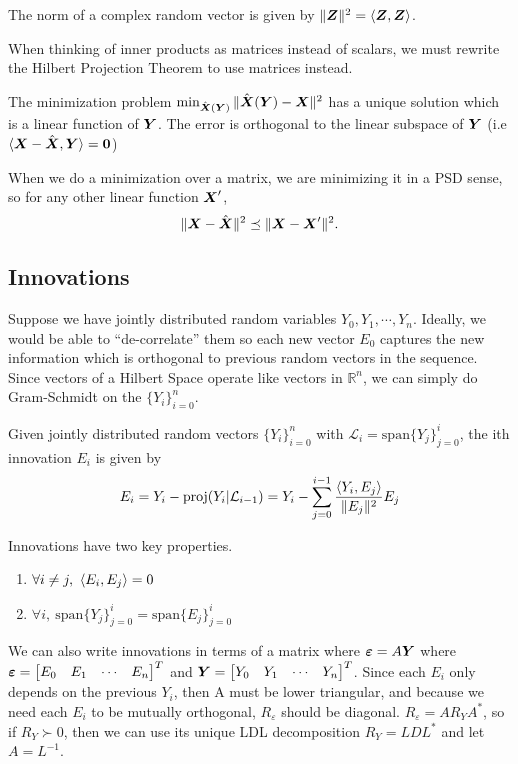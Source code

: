 \begin{definition}
	The norm of a complex random vector is given by $\|\boldsymbol{Z}\|^2 = \langle \boldsymbol{Z}, \boldsymbol{Z} \rangle$.
	\label{defn:norm}
\end{definition}
When thinking of inner products as matrices instead of scalars, we must rewrite the Hilbert Projection Theorem to use matrices instead.
\begin{theorem}
	The minimization problem $\min_{\hat{\boldsymbol{X}}(\boldsymbol{Y})}\|\hat{\boldsymbol{X}}(\boldsymbol{Y}) - \boldsymbol{X}\|^2$ has a unique solution which is a linear function of $\boldsymbol{Y}$. The error is orthogonal to the linear subspace of $\boldsymbol{Y}$ (i.e $\langle \boldsymbol{X} - \hat{\boldsymbol{X}}, \boldsymbol{Y} \rangle = \boldsymbol{0}$)
	\label{thm:hilbert-projection}
\end{theorem}
When we do a minimization over a matrix, we are minimizing it in a PSD sense, so for any other linear function $\boldsymbol{X}'$, \[
	\|\boldsymbol{X}-\hat{\boldsymbol{X}}\|^2  \preceq \|\boldsymbol{X} - \boldsymbol{X}'\|^2.
\]
\subsection{Innovations}
Suppose we have jointly distributed random variables $Y_0, Y_1,\cdots,Y_n$.
Ideally, we would be able to ``de-correlate'' them so each new vector $E_0$ captures the new information which is orthogonal to previous random vectors in the sequence.
Since vectors of a Hilbert Space operate like vectors in $\mathbb{R}^n$, we can simply do Gram-Schmidt on the $\{Y_i\}_{i=0}^n$.
\begin{definition}
	Given jointly distributed random vectors $\{Y_i\}_{i=0}^n$ with $\mathcal{L}_i = \text{span}\{Y_j\}_{j=0}^i$, the ith innovation $E_i$ is given by
	\[
		E_i = Y_i - \text{proj}(Y_i|\mathcal{L}_{i-1}) = Y_i - \sum_{j=0}^{i-1}\frac{\langle Y_i, E_j \rangle}{\|E_j\|^2}E_j
	\]
	\label{defn:innovation}
\end{definition}
Innovations have two key properties.
\begin{enumerate}
	\item $\forall i\neq j,\ \ip{E_i}{E_j}=0$
	\item $\forall i,\ \text{span}\{Y_j\}_{j=0}^i = \text{span}\{E_j\}_{j=0}^i$
\end{enumerate}
We can also write innovations in terms of a matrix where $\boldsymbol{\varepsilon} = A\boldsymbol{Y}$ where $\boldsymbol{\varepsilon} = \begin{bmatrix}E_0 & E_1 & \cdots & E_n\end{bmatrix}^T$ and $\boldsymbol{Y} = \begin{bmatrix}Y_0 & Y_1 & \cdots & Y_n\end{bmatrix}^T$.
Since each $E_i$ only depends on the previous $Y_i$, then A must be lower triangular, and because we need each $E_i$ to be mutually orthogonal, $R_{\varepsilon}$ should be diagonal.
$R_{\varepsilon} = AR_YA^*$, so if $R_Y \succ 0$, then we can use its unique LDL decomposition $R_Y = LDL^*$ and let $A = L^{-1}$.
